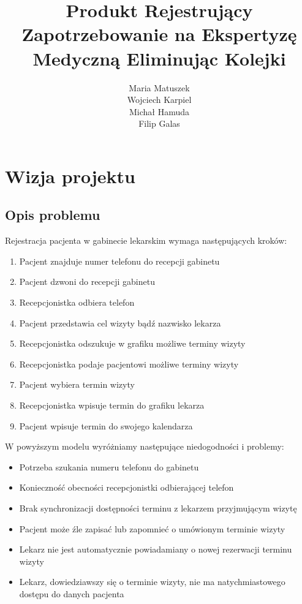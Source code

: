 \documentclass[10pt,a4paper]{article}
\title{Produkt Rejestrujący Zapotrzebowanie na Ekspertyzę Medyczną Eliminując Kolejki}
\author{Maria Matuszek\\ Wojciech Karpiel\\ Michał Hamuda\\ Filip Galas}
\date{}
\begin{document}
\maketitle

\tableofcontents

\section{Wizja projektu}

\subsection{Opis problemu}
Rejestracja pacjenta w gabinecie lekarskim wymaga następujących kroków:


\begin{enumerate}
  \item Pacjent znajduje numer telefonu do recepcji gabinetu
  \item Pacjent dzwoni do recepcji gabinetu
  \item Recepcjonistka odbiera telefon
  \item Pacjent przedstawia cel wizyty bądź nazwisko lekarza
  \item Recepcjonistka odszukuje w grafiku możliwe terminy wizyty
  \item Recepcjonistka podaje pacjentowi możliwe terminy wizyty
  \item Pacjent wybiera termin wizyty
  \item Recepcjonistka wpisuje termin do grafiku lekarza
  \item Pacjent wpisuje termin do swojego kalendarza
\end{enumerate}

W powyższym modelu wyróżniamy następujące niedogodności i problemy:

\begin{itemize}
  \item Potrzeba szukania numeru telefonu do gabinetu
  \item Konieczność obecności recepcjonistki odbierającej telefon
  \item Brak synchronizacji dostępności terminu z lekarzem przyjmującym wizytę
  \item Pacjent może źle zapisać lub zapomnieć o umówionym terminie wizyty
  \item Lekarz nie jest automatycznie powiadamiany o nowej rezerwacji terminu wizyty
  \item Lekarz, dowiedziawszy się o terminie wizyty, nie ma natychmiastowego dostępu do danych pacjenta
\end{itemize}
\end{document}
